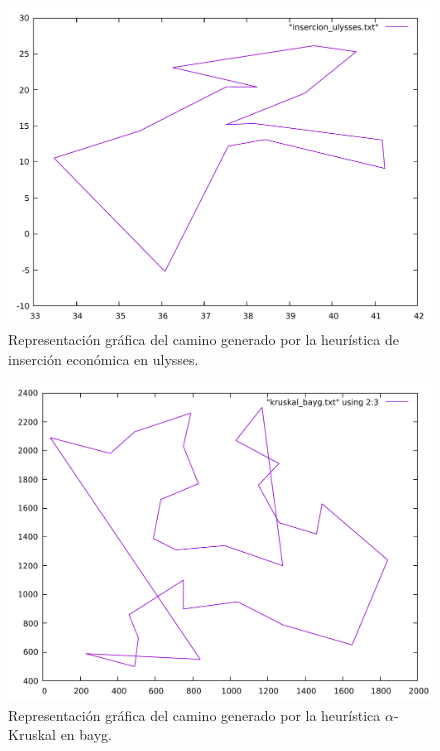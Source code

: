 \begin{figure}[H]
  \centering
  \includegraphics[scale=0.5]{../src/insercion_ulysses.pdf}
  \caption{Representación gráfica del camino generado por la heurística de inserción económica en ulysses.}
\end{figure} 

\begin{figure}[H]
  \centering
  \includegraphics[scale=0.5]{../src/kruskal_bayg.pdf}
  \caption{Representación gráfica del camino generado por la heurística $\alpha$-Kruskal en bayg.}
\end{figure} 

